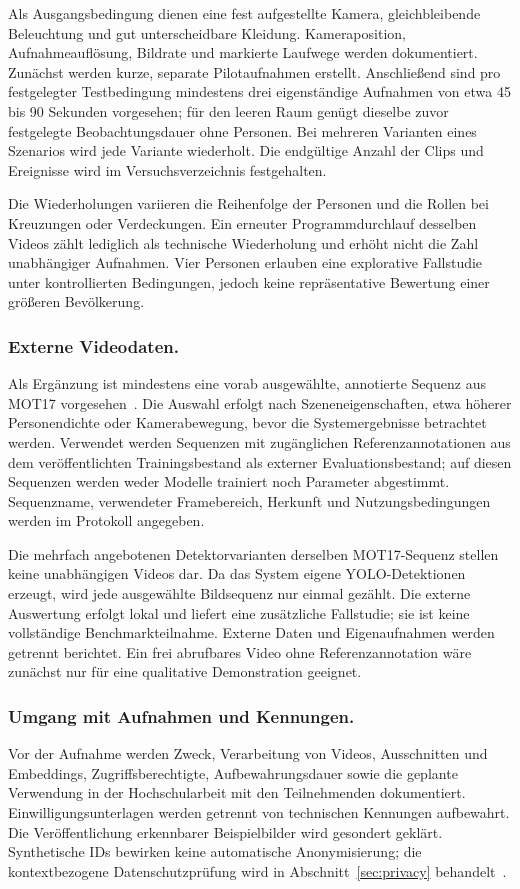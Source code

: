 \documentclass[runningheads]{llncs}
\begin{document}
Als Ausgangsbedingung dienen eine fest aufgestellte Kamera, gleichbleibende Beleuchtung und gut unterscheidbare Kleidung. Kameraposition, Aufnahmeauflösung, Bildrate und markierte Laufwege werden dokumentiert. Zunächst werden kurze, separate Pilotaufnahmen erstellt. Anschließend sind pro festgelegter Testbedingung mindestens drei eigenständige Aufnahmen von etwa 45 bis 90 Sekunden vorgesehen; für den leeren Raum genügt dieselbe zuvor festgelegte Beobachtungsdauer ohne Personen. Bei mehreren Varianten eines Szenarios wird jede Variante wiederholt. Die endgültige Anzahl der Clips und Ereignisse wird im Versuchsverzeichnis festgehalten.

Die Wiederholungen variieren die Reihenfolge der Personen und die Rollen bei Kreuzungen oder Verdeckungen. Ein erneuter Programmdurchlauf desselben Videos zählt lediglich als technische Wiederholung und erhöht nicht die Zahl unabhängiger Aufnahmen. Vier Personen erlauben eine explorative Fallstudie unter kontrollierten Bedingungen, jedoch keine repräsentative Bewertung einer größeren Bevölkerung.

\subsubsection{Externe Videodaten.}
Als Ergänzung ist mindestens eine vorab ausgewählte, annotierte Sequenz aus MOT17 vorgesehen~\cite{dendorfer2021motchallenge,mot17-data}. Die Auswahl erfolgt nach Szeneneigenschaften, etwa höherer Personendichte oder Kamerabewegung, bevor die Systemergebnisse betrachtet werden. Verwendet werden Sequenzen mit zugänglichen Referenzannotationen aus dem veröffentlichten Trainingsbestand als externer Evaluationsbestand; auf diesen Sequenzen werden weder Modelle trainiert noch Parameter abgestimmt. Sequenzname, verwendeter Framebereich, Herkunft und Nutzungsbedingungen werden im Protokoll angegeben.

Die mehrfach angebotenen Detektorvarianten derselben MOT17-Sequenz stellen keine unabhängigen Videos dar. Da das System eigene YOLO-Detektionen erzeugt, wird jede ausgewählte Bildsequenz nur einmal gezählt. Die externe Auswertung erfolgt lokal und liefert eine zusätzliche Fallstudie; sie ist keine vollständige Benchmarkteilnahme. Externe Daten und Eigenaufnahmen werden getrennt berichtet. Ein frei abrufbares Video ohne Referenzannotation wäre zunächst nur für eine qualitative Demonstration geeignet.

\subsubsection{Umgang mit Aufnahmen und Kennungen.}
Vor der Aufnahme werden Zweck, Verarbeitung von Videos, Ausschnitten und Embeddings, Zugriffsberechtigte, Aufbewahrungsdauer sowie die geplante Verwendung in der Hochschularbeit mit den Teilnehmenden dokumentiert. Einwilligungsunterlagen werden getrennt von technischen Kennungen aufbewahrt. Die Veröffentlichung erkennbarer Beispielbilder wird gesondert geklärt. Synthetische IDs bewirken keine automatische Anonymisierung; die kontextbezogene Datenschutzprüfung wird in Abschnitt~\ref{sec:privacy} behandelt~\cite{edpb-video}.
\end{document}
